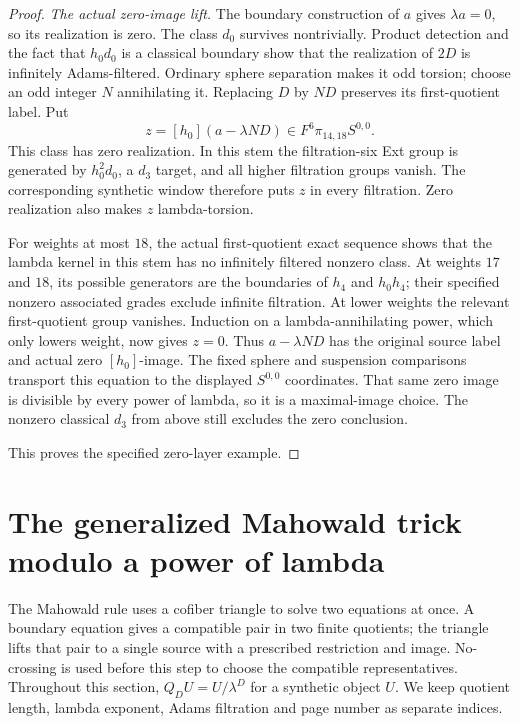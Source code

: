 \begin{proof}
\textit{The actual zero-image lift.} The boundary construction
of $a$ gives $\lambda a=0$, so its realization is zero.
The class $d_0$ survives nontrivially. Product detection and the
fact that $h_0d_0$ is a classical boundary show that the
realization of $2D$ is infinitely Adams-filtered. Ordinary
sphere separation makes it odd torsion; choose an odd integer
$N$ annihilating it. Replacing $D$ by $ND$ preserves its
first-quotient label. Put
\[
z=[h_0](a-\lambda ND)\in F^6\pi_{14,18}S^{0,0}.
\]
This class has zero realization. In this stem the filtration-six
Ext group is generated by $h_0^2d_0$, a $d_3$ target, and all
higher filtration groups vanish. The corresponding synthetic
window therefore puts $z$ in every filtration. Zero realization
also makes $z$ lambda-torsion.

For weights at most $18$, the actual first-quotient exact sequence
shows that the lambda kernel in this stem has no infinitely
filtered nonzero class. At weights $17$ and $18$, its possible
generators are the boundaries of $h_4$ and $h_0h_4$;
their specified nonzero associated grades exclude infinite
filtration. At lower weights the relevant first-quotient group
vanishes. Induction on a lambda-annihilating power, which only
lowers weight, now gives $z=0$. Thus $a-\lambda ND$ has the
original source label and actual zero $[h_0]$-image. The fixed
sphere and suspension comparisons transport this equation to
the displayed $S^{0,0}$ coordinates.
That same zero image is divisible by every power of lambda,
so it is a maximal-image choice. The nonzero classical $d_3$
from above still excludes the zero conclusion.

This proves the specified zero-layer example.
\end{proof}

\section{The generalized Mahowald trick modulo a power of lambda}

The Mahowald rule uses a cofiber triangle to solve two equations at
once. A boundary equation gives a compatible pair in two finite
quotients; the triangle lifts that pair to a single source with a
prescribed restriction and image. No-crossing is used before this step
to choose the compatible representatives.
Throughout this section, $Q_DU=U/\lambda^D$ for a synthetic object
$U$. We keep quotient length, lambda exponent, Adams filtration and
page number as separate indices.

